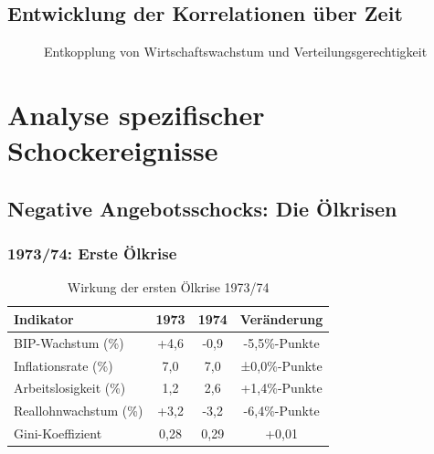 \subsection{Entwicklung der Korrelationen über Zeit}

\begin{figure}[ht]
\centering
{}
\caption{Entkopplung von Wirtschaftswachstum und Verteilungsgerechtigkeit}
\label{fig:entkopplung}
\end{figure}

\section{Analyse spezifischer Schockereignisse}

\subsection{Negative Angebotsschocks: Die Ölkrisen}

\subsubsection{1973/74: Erste Ölkrise}

\begin{table}[ht]
\centering
\begin{tabular}{lccc}
\toprule
\textbf{Indikator} & \textbf{1973} & \textbf{1974} & \textbf{Veränderung} \\
\midrule
BIP-Wachstum (\%) & +4,6 & -0,9 & -5,5\%-Punkte \\
Inflationsrate (\%) & 7,0 & 7,0 & ±0,0\%-Punkte \\
Arbeitslosigkeit (\%) & 1,2 & 2,6 & +1,4\%-Punkte \\
Reallohnwachstum (\%) & +3,2 & -3,2 & -6,4\%-Punkte \\
Gini-Koeffizient & 0,28 & 0,29 & +0,01 \\
\bottomrule
\end{tabular}
\caption{Wirkung der ersten Ölkrise 1973/74}
\label{tab:oelkrise-1974}
\end{table}

